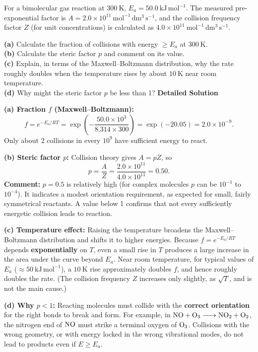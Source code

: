 \documentclass[11pt]{article}
\begin{document}
\begin{exoresolu}
For a bimolecular gas reaction at $300\ \mathrm{K}$, $E_a = 50.0\ \mathrm{kJ\,mol^{-1}}$. The measured pre-exponential factor is $A = 2.0 \times 10^{11}\ \mathrm{mol^{-1}\,dm^3\,s^{-1}}$, and the collision frequency factor $Z$ (for unit concentrations) is calculated as $4.0 \times 10^{11}\ \mathrm{mol^{-1}\,dm^3\,s^{-1}}$.

\textbf{(a)} Calculate the fraction of collisions with energy $\ge E_a$ at $300\ \mathrm{K}$. \\
\textbf{(b)} Calculate the steric factor $p$ and comment on its value. \\
\textbf{(c)} Explain, in terms of the Maxwell--Boltzmann distribution, why the rate roughly doubles when the temperature rises by about $10\ \mathrm{K}$ near room temperature. \\
\textbf{(d)} Why might the steric factor $p$ be less than 1?
\tcblower
\textbf{Detailed Solution}

\textbf{(a) Fraction $f$ (Maxwell--Boltzmann):}
\[ f = e^{-E_a/RT} = \exp\left(-\frac{50.0 \times 10^{3}}{8.314 \times 300}\right) = \exp(-20.05) = \boxed{2.0 \times 10^{-9}}. \]
Only about 2 collisions in every $10^{9}$ have sufficient energy to react.

\textbf{(b) Steric factor $p$:} Collision theory gives $A = pZ$, so
\[ p = \frac{A}{Z} = \frac{2.0 \times 10^{11}}{4.0 \times 10^{11}} = \boxed{0.50}. \]
\textbf{Comment:} $p = 0.5$ is relatively high (for complex molecules $p$ can be $10^{-1}$ to $10^{-4}$). It indicates a modest orientation requirement, as expected for small, fairly symmetrical reactants. A value below 1 confirms that not every sufficiently energetic collision leads to reaction.

\textbf{(c) Temperature effect:} Raising the temperature broadens the Maxwell--Boltzmann distribution and shifts it to higher energies. Because $f = e^{-E_a/RT}$ depends \textbf{exponentially} on $T$, even a small rise in $T$ produces a large increase in the area under the curve beyond $E_a$. Near room temperature, for typical values of $E_a$ ($\approx 50\ \mathrm{kJ\,mol^{-1}}$), a $10\ \mathrm{K}$ rise approximately doubles $f$, and hence roughly doubles the rate. (The collision frequency $Z$ increases only slightly, as $\sqrt{T}$, and is not the main cause.)

\textbf{(d) Why $p < 1$:} Reacting molecules must collide with the \textbf{correct orientation} for the right bonds to break and form. For example, in $\ce{NO + O3 -> NO2 + O2}$, the nitrogen end of $\ce{NO}$ must strike a terminal oxygen of $\ce{O3}$. Collisions with the wrong geometry, or with energy locked in the wrong vibrational modes, do not lead to products even if $E \ge E_a$.
\end{exoresolu}
\end{document}
